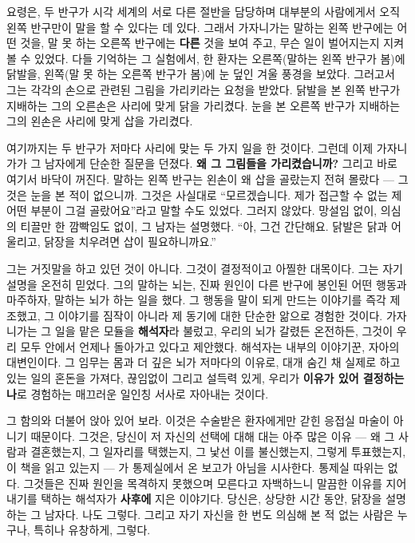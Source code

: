 요령은, 두 반구가 시각 세계의 서로 다른 절반을 담당하며 대부분의 사람에게서 오직 왼쪽 반구만이 말을 할 수 있다는 데 있다. 그래서 가자니가는 말하는 왼쪽 반구에는 어떤 것을, 말 못 하는 오른쪽 반구에는 \textbf{다른} 것을 보여 주고, 무슨 일이 벌어지는지 지켜볼 수 있었다. 다들 기억하는 그 실험에서, 한 환자는 오른쪽(말하는 왼쪽 반구가 봄)에 닭발을, 왼쪽(말 못 하는 오른쪽 반구가 봄)에 눈 덮인 겨울 풍경을 보았다. 그러고서 그는 각각의 손으로 관련된 그림을 가리키라는 요청을 받았다. 닭발을 본 왼쪽 반구가 지배하는 그의 오른손은 사리에 맞게 닭을 가리켰다. 눈을 본 오른쪽 반구가 지배하는 그의 왼손은 사리에 맞게 삽을 가리켰다.

여기까지는 두 반구가 저마다 사리에 맞는 두 가지 일을 한 것이다. 그런데 이제 가자니가가 그 남자에게 단순한 질문을 던졌다. \textbf{왜 그 그림들을 가리켰습니까?} 그리고 바로 여기서 바닥이 꺼진다. 말하는 왼쪽 반구는 왼손이 왜 삽을 골랐는지 전혀 몰랐다 — 그것은 눈을 본 적이 없으니까. 그것은 사실대로 ``모르겠습니다. 제가 접근할 수 없는 제 어떤 부분이 그걸 골랐어요''라고 말할 수도 있었다. 그러지 않았다. 망설임 없이, 의심의 티끌만 한 깜빡임도 없이, 그 남자는 설명했다. ``아, 그건 간단해요. 닭발은 닭과 어울리고, 닭장을 치우려면 삽이 필요하니까요.''

그는 거짓말을 하고 있던 것이 아니다. 그것이 결정적이고 아찔한 대목이다. 그는 자기 설명을 온전히 믿었다. 그의 말하는 뇌는, 진짜 원인이 다른 반구에 봉인된 어떤 행동과 마주하자, 말하는 뇌가 하는 일을 했다. 그 행동을 말이 되게 만드는 이야기를 즉각 제조했고, 그 이야기를 짐작이 아니라 제 동기에 대한 단순한 앎으로 경험한 것이다. 가자니가는 그 일을 맡은 모듈을 \textbf{해석자}라 불렀고, 우리의 뇌가 갈렸든 온전하든, 그것이 우리 모두 안에서 언제나 돌아가고 있다고 제안했다. 해석자는 내부의 이야기꾼, 자아의 대변인이다. 그 임무는 몸과 더 깊은 뇌가 저마다의 이유로, 대개 숨긴 채 실제로 하고 있는 일의 혼돈을 가져다, 끊임없이 그리고 설득력 있게, 우리가 \textbf{이유가 있어 결정하는 나}로 경험하는 매끄러운 일인칭 서사로 자아내는 것이다.

그 함의와 더불어 앉아 있어 보라. 이것은 수술받은 환자에게만 갇힌 응접실 마술이 아니기 때문이다. 그것은, 당신이 저 자신의 선택에 대해 대는 아주 많은 이유 — 왜 그 사람과 결혼했는지, 그 일자리를 택했는지, 그 낯선 이를 불신했는지, 그렇게 투표했는지, 이 책을 읽고 있는지 — 가 통제실에서 온 보고가 아님을 시사한다. 통제실 따위는 없다. 그것들은 진짜 원인을 목격하지 못했으며 모른다고 자백하느니 말끔한 이유를 지어내기를 택하는 해석자가 \textbf{사후에} 지은 이야기다. 당신은, 상당한 시간 동안, 닭장을 설명하는 그 남자다. 나도 그렇다. 그리고 자기 자신을 한 번도 의심해 본 적 없는 사람은 누구나, 특히나 유창하게, 그렇다.

